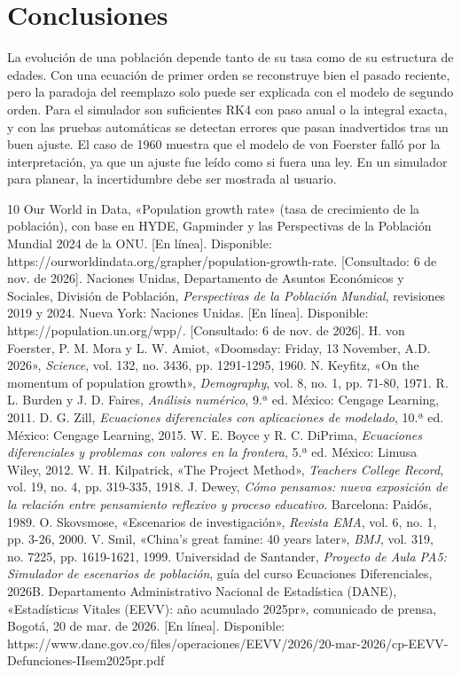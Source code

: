 \documentclass[10pt,twocolumn,letterpaper]{article}
\begin{document}
\section{Conclusiones}
La evolución de una población depende tanto de su tasa como de su estructura de edades. Con una ecuación de primer orden se reconstruye bien el pasado reciente, pero la paradoja del reemplazo solo puede ser explicada con el modelo de segundo orden. Para el simulador son suficientes RK4 con paso anual o la integral exacta, y con las pruebas automáticas se detectan errores que pasan inadvertidos tras un buen ajuste. El caso de 1960 muestra que el modelo de von Foerster falló por la interpretación, ya que un ajuste fue leído como si fuera una ley. En un simulador para planear, la incertidumbre debe ser mostrada al usuario.

\begin{thebibliography}{10}\small
{} Our World in Data, «Population growth rate» (tasa de crecimiento de la población), con base en HYDE, Gapminder y las Perspectivas de la Población Mundial 2024 de la ONU. [En línea]. Disponible: https://ourworldindata.org/grapher/population-growth-rate. [Consultado: 6 de nov. de 2026].
 Naciones Unidas, Departamento de Asuntos Económicos y Sociales, División de Población, \textit{Perspectivas de la Población Mundial}, revisiones 2019 y 2024. Nueva York: Naciones Unidas. [En línea]. Disponible: https://population.un.org/wpp/. [Consultado: 6 de nov. de 2026].
 H. von Foerster, P. M. Mora y L. W. Amiot, «Doomsday: Friday, 13 November, A.D. 2026», \textit{Science}, vol. 132, no. 3436, pp. 1291-1295, 1960.
 N. Keyfitz, «On the momentum of population growth», \textit{Demography}, vol. 8, no. 1, pp. 71-80, 1971.
 R. L. Burden y J. D. Faires, \textit{Análisis numérico}, 9.ª ed. México: Cengage Learning, 2011.
 D. G. Zill, \textit{Ecuaciones diferenciales con aplicaciones de modelado}, 10.ª ed. México: Cengage Learning, 2015.
 W. E. Boyce y R. C. DiPrima, \textit{Ecuaciones diferenciales y problemas con valores en la frontera}, 5.ª ed. México: Limusa Wiley, 2012.
 W. H. Kilpatrick, «The Project Method», \textit{Teachers College Record}, vol. 19, no. 4, pp. 319-335, 1918.
 J. Dewey, \textit{Cómo pensamos: nueva exposición de la relación entre pensamiento reflexivo y proceso educativo}. Barcelona: Paidós, 1989.
 O. Skovsmose, «Escenarios de investigación», \textit{Revista EMA}, vol. 6, no. 1, pp. 3-26, 2000.
 V. Smil, «China's great famine: 40 years later», \textit{BMJ}, vol. 319, no. 7225, pp. 1619-1621, 1999.
 Universidad de Santander, \textit{Proyecto de Aula PA5: Simulador de escenarios de población}, guía del curso Ecuaciones Diferenciales, 2026B.
 Departamento Administrativo Nacional de Estadística (DANE), «Estadísticas Vitales (EEVV): año acumulado 2025pr», comunicado de prensa, Bogotá, 20 de mar. de 2026. [En línea]. Disponible: https://www.dane.gov.co/files/operaciones/EEVV/2026/20-mar-2026/cp-EEVV-Defunciones-IIsem2025pr.pdf
\end{thebibliography}
\end{document}
